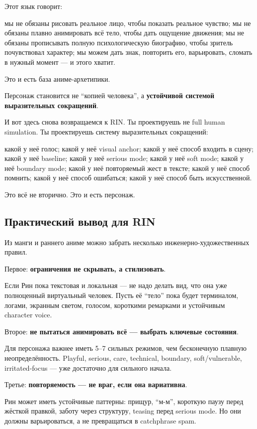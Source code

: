 Этот язык говорит:

мы не обязаны рисовать реальное лицо, чтобы показать реальное чувство;
мы не обязаны плавно анимировать всё тело, чтобы дать ощущение движения;
мы не обязаны прописывать полную психологическую биографию, чтобы
зритель почувствовал характер; мы можем дать знак, повторить его,
варьировать, сломать в нужный момент --- и этого хватит.

Это и есть база аниме-архетипики.

Персонаж становится не ``копией человека'', а \textbf{устойчивой
системой выразительных сокращений}.

И вот здесь снова возвращаемся к RIN. Ты проектируешь не full human
simulation. Ты проектируешь систему выразительных сокращений:

какой у неё голос; какой у неё visual anchor; какой у неё способ входить
в сцену; какой у неё baseline; какой у неё serious mode; какой у неё
soft mode; какой у неё boundary mode; какой у неё повторяемый жест в
тексте; какой у неё способ помнить; какой у неё способ ошибаться; какой
у неё способ быть искусственной.

Это всё не вторично. Это и есть персонаж.

\subsection*{Практический вывод для RIN}

Из манги и раннего аниме можно забрать несколько
инженерно-художественных правил.

Первое: \textbf{ограничения не скрывать, а стилизовать}.

Если Рин пока текстовая и локальная --- не надо делать вид, что она уже
полноценный виртуальный человек. Пусть её ``тело'' пока будет
терминалом, логами, экранным светом, голосом, короткими ремарками и
устойчивым character voice.

Второе: \textbf{не пытаться анимировать всё --- выбрать ключевые
состояния}.

Для персонажа важнее иметь 5--7 сильных режимов, чем бесконечную плавную
неопределённость. Playful, serious, care, technical, boundary,
soft/\hspace{0pt}vulnerable, irritated-focus --- уже достаточно для сильного начала.

Третье: \textbf{повторяемость --- не враг, если она вариативна}.

Рин может иметь устойчивые паттерны: прищур, ``м-м'', короткую паузу
перед жёсткой правкой, заботу через структуру, teasing перед serious
mode. Но они должны варьироваться, а не превращаться в catchphrase spam.

